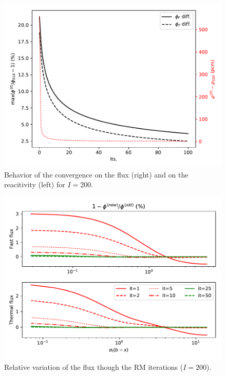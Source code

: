 \documentclass{ictt26}
\begin{document}
\begin{figure}[htbp]
  \centering
  \includegraphics[width=.8\linewidth]{figures/kflxconv.pdf}
  \caption{Behavior of the convergence on the flux (right) and on the reacitivity (left) for $I = 200$.}
  \label{fig:kflx}
\end{figure}
%
\begin{figure}[hbtp]
  \centering
  \includegraphics[width=.8\linewidth]{figures/eflxconv.pdf}
  \caption{Relative variation of the flux though the RM iterations ($I = 200$).}
  \label{fig:eflx}
\end{figure}
\end{document}
